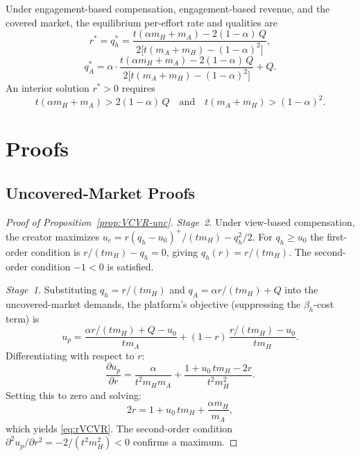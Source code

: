 \documentclass[mnsc,nonblindrev]{informs3_NoOR}
\begin{document}
\begin{proposition}[EC\,+\,ER, Covered]\label{prop:ECER-cov}
Under engagement-based compensation, engagement-based revenue, and the covered market, the equilibrium per-effort rate and qualities are
\begin{equation}\label{eq:rECER-cov}
r^{*} = q_h^{*} = \frac{t(\alpha m_H +  m_A) - 2(1-\alpha)\,Q}{2\bigl[t(m_A+ m_H) - (1-\alpha)^2\bigr]},
\end{equation}
\begin{equation}\label{eq:qAECER-cov}
q_A^{*} = \alpha \cdot \frac{t(\alpha m_H +  m_A) - 2(1-\alpha)\,Q}{2\bigl[t(m_A+ m_H) - (1-\alpha)^2\bigr]} + Q.
\end{equation}
An interior solution $r^* > 0$ requires
\begin{equation}\label{eq:ECERcov-cond}
t(\alpha m_H +  m_A) > 2(1-\alpha)\,Q \quad \text{and} \quad t(m_A+ m_H) > (1-\alpha)^2.
\end{equation}
\end{proposition}
 
 


 
\appendix
\section{Proofs}\label{app:proofs}
 
\subsection*{Uncovered-Market Proofs}
 
\begin{proof}[Proof of Proposition~\ref{prop:VCVR-unc}]
\textit{Stage~2.} Under view-based compensation, the creator maximizes
$u_c = r(q_h - u_0)^+/(t m_H) - q_h^2/2$.
For $q_h \geq u_0$ the first-order condition is $r/(t m_H) - q_h = 0$, giving $q_h(r) = r/(t m_H)$. The second-order condition $-1 < 0$ is satisfied.
 
\textit{Stage~1.} Substituting $q_h = r/(t m_H)$ and $q_A = \alpha r/(t m_H) + Q$ into the uncovered-market demands, the platform's objective (suppressing the $\beta_h$-cost term) is
\[
u_p = \frac{\alpha r/(t m_H) + Q - u_0}{t m_A} + (1-r)\,\frac{r/(t m_H) - u_0}{t m_H}.
\]
Differentiating with respect to $r$:
\[
\frac{\partial u_p}{\partial r} = \frac{\alpha}{t^2 m_H m_A} + \frac{1 + u_0\,t m_H - 2r}{t^2 m_H^2}.
\]
Setting this to zero and solving:
\[
2r = 1 + u_0\,t m_H + \frac{\alpha m_H}{ m_A},
\]
which yields \eqref{eq:rVCVR}.
The second-order condition $\partial^2 u_p/\partial r^2 = -2/(t^2 m_H^2) < 0$ confirms a maximum.
\end{proof}
 
\end{document}
